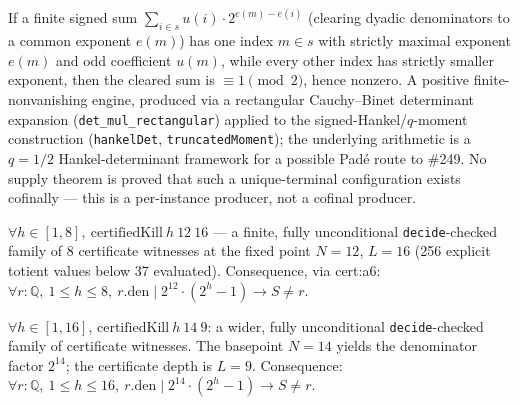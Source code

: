 \begin{prop}
If a finite signed sum $\sum_{i \in s} u(i)\cdot 2^{e(m)-e(i)}$ (clearing dyadic denominators to a common exponent $e(m)$) has one index $m \in s$ with strictly maximal exponent $e(m)$ and odd coefficient $u(m)$, while every other index has strictly smaller exponent, then the cleared sum is $\equiv 1 \pmod 2$, hence nonzero. A positive finite-nonvanishing engine, produced via a rectangular Cauchy--Binet determinant expansion (\texttt{det\_mul\_rectangular}) applied to the signed-Hankel/$q$-moment construction (\texttt{hankelDet}, \texttt{truncatedMoment}); the underlying arithmetic is a $q=1/2$ Hankel-determinant framework for a possible Pad\'e route to \#249. No supply theorem is proved that such a unique-terminal configuration exists cofinally — this is a per-instance producer, not a cofinal producer.
\par\noindent{}    
\end{prop}

\begin{prop}
$\forall h \in [1,8],\ \mathrm{certifiedKill}\ h\ 12\ 16$ — a finite, fully unconditional \texttt{decide}-checked family of 8 certificate witnesses at the fixed point $N=12$, $L=16$ (256 explicit totient values below 37 evaluated). Consequence, via cert:a6: $\forall r:\mathbb{Q},\ 1\le h\le 8,\ r.\mathrm{den}\mid 2^{12}\cdot(2^h-1) \to S \ne r$.
\par\noindent{}    
\end{prop}

\begin{prop}
$\forall h \in [1,16]$, $\mathrm{certifiedKill}\ h\ 14\ 9$: a wider,
fully unconditional \texttt{decide}-checked family of certificate witnesses.
The basepoint $N=14$ yields the denominator factor $2^{14}$; the certificate
depth is $L=9$.  Consequence:
$\forall r:\mathbb{Q},\ 1\le h\le 16,\ r.\mathrm{den}\mid
2^{14}\cdot(2^h-1) \to S \ne r$.
\par\noindent{}   
\end{prop}

